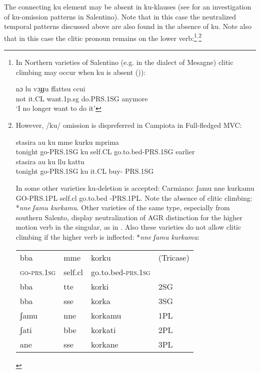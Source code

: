 \documentclass[output=paper]{langscibook}
\begin{document}
The connecting ku element may be absent in ku-klauses (see \citet{ledgeway2015a} for an investigation of ku-omission patterns in Salentino).  Note that in this case the neutralized temporal patterns discussed above are also found in the absence of ku. Note also that in this case the clitic pronoun remains on the lower verb:\footnote{In Northern varieties of Salentino (e.g. in the dialect of Mesagne) clitic climbing may occur when ku is absent (\cite{calabrese1993a, terzi1992a, terzi1994a, terzi1996a})):

\ea \label{fn8ex}\gll nɔ  lu  vɔɟɟu  ffattsu   ccui    \\ 
 not it.CL  want.1p.sg  do.PRS.1SG  anymore\\
 \glt `I no longer want to do it’
\z 

}$^,$\footnote{However, /ku/ omission is dispreferred in Campiota in Full-fledged MVC:

\ea \label{fn9ex}
    \ea \label{fn9exa} \gll stasira au      ku  mme    kurku       mprima\\
     tonight go-PRS.1SG  ku self.CL  go.to.bed-PRS.1SG  earlier\\
    \ex \label{fn9exb}\gll stasira  au       ku  llu   kattu\\
   tonight  go-PRS.1SG  ku  it.CL buy- PRS.1SG \\
    \z
\ex \label{fn9ex2}
    \z
\z
  
In some other varieties ku-deletion is accepted:  Carmiano: ʃamu nne kurkamu GO-PRS.1PL self.cl   go.to.bed -PRS.1PL. Note the absence of clitic climbing:  *\textit{nne ʃamu kurkamu}.  Other varieties of the same type, especially from southern Salento, display neutralization of AGR distinction for the higher motion verb in the singular, as in .  Also these varieties do not allow clitic climbing if the higher verb is inflected: *\textit{nne ʃamu kurkamu}:  

\ea \label{fn9ex3}
\begin{tabular}[t]{@{}llll@{}}
bba        & mme     & korku             & (Tricase) \\
\textsc{go-prs.1sg} & self.cl & go.to.bed-\textsc{prs.1sg} &    \\
bba        & tte     & korki             & \textsc{2SG}\\
bba        & sse     & korka             & \textsc{3SG}\\
ʃamu       & nne     & korkamu           & \textsc{1PL}\\
ʃati       & bbe     & korkati           & \textsc{2PL}\\
ane        & sse     & korkane           & \textsc{3PL}
\end{tabular}
\z}
\end{document}

